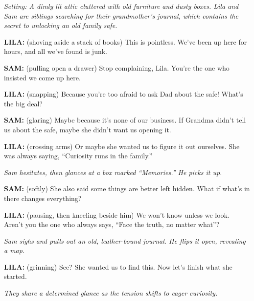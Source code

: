 \documentclass[12pt]{article}
\begin{document}
\begin{tcolorbox}[colframe=black!60, colback=white, 
coltitle=black, colbacktitle=black!15, fonttitle=\bfseries\Large, 
title=Text: The Locked Room, halign title=center, left=10pt, right=10pt, top=10pt, bottom=15pt]

\textit{Setting: A dimly lit attic cluttered with old furniture and dusty boxes. Lila and Sam are siblings searching for their grandmother's journal, which contains the secret to unlocking an old family safe.}

\textbf{LILA:} (shoving aside a stack of books) This is pointless. We’ve been up here for hours, and all we’ve found is junk.

\textbf{SAM:} (pulling open a drawer) Stop complaining, Lila. You’re the one who insisted we come up here.

\textbf{LILA:} (snapping) Because you’re too afraid to ask Dad about the safe! What’s the big deal?

\textbf{SAM:} (glaring) Maybe because it’s none of our business. If Grandma didn’t tell us about the safe, maybe she didn’t want us opening it.

\textbf{LILA:} (crossing arms) Or maybe she wanted us to figure it out ourselves. She was always saying, “Curiosity runs in the family.”

\textit{Sam hesitates, then glances at a box marked “Memories.” He picks it up.}

\textbf{SAM:} (softly) She also said some things are better left hidden. What if what’s in there changes everything?

\textbf{LILA:} (pausing, then kneeling beside him) We won’t know unless we look. Aren’t you the one who always says, “Face the truth, no matter what”?

\textit{Sam sighs and pulls out an old, leather-bound journal. He flips it open, revealing a map.}

\textbf{LILA:} (grinning) See? She wanted us to find this. Now let’s finish what she started.

\textit{They share a determined glance as the tension shifts to eager curiosity.}

 

\end{tcolorbox}
\end{document}
